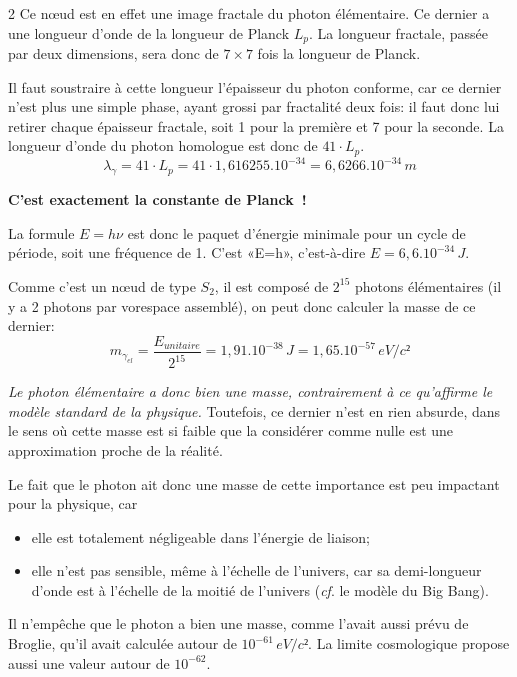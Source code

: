 \begin{multicols}{2}
Ce nœud est en effet une image fractale du photon élémentaire. Ce dernier a une
longueur d'onde de la longueur de Planck $L_p$. La longueur fractale,
passée par deux dimensions, sera donc de $7\times 7$ fois la longueur de
Planck.

Il faut soustraire à cette longueur l'épaisseur du photon conforme, car ce
dernier n'est plus une simple phase, ayant grossi par fractalité deux
fois: il faut donc lui retirer chaque épaisseur fractale, soit 1 pour
la première et 7 pour la seconde. La longueur d'onde du photon
homologue est donc de $41 \cdot L_p$.
\begin{equation*}
\lambda_{\gamma} = 41 \cdot L_p = 41 \cdot 1,616255.10^{-34} = 6,6266.10^{-34}\,m
\end{equation*}

\textbf{C'est exactement la constante de Planck !}
\medskip

La formule $E=h\nu$ est donc le paquet d'énergie minimale pour un cycle
de période, soit une fréquence de 1. C'est «E=h», c'est-à-dire
$E=6,6.10^{-34}\,J$.
\medskip

Comme c'est un nœud de type $S_2$, il est composé de $2^{15}$ photons
élémentaires (il y a 2 photons par vorespace assemblé), on peut donc
calculer la masse de ce dernier:
\begin{equation*}
m_{\gamma_{el}} = \frac {E_{unitaire}} {2^{15}} = 1,91.10^{-38}\,J = 1,65.10^{-57}\,eV/c²
\end{equation*}

\textit{Le photon élémentaire a donc bien une masse, contrairement à ce
qu'affirme le modèle standard de la physique.} Toutefois, ce dernier
n'est en rien absurde, dans le sens où cette masse est si faible que la
considérer comme nulle est une approximation proche de la réalité.

Le fait que le photon ait donc une masse de cette importance est peu
impactant pour la physique, car

\begin{itemize}
	\item elle est totalement négligeable dans l'énergie de liaison;
	\item elle n'est pas sensible, même à l'échelle de l'univers, car sa
	demi-longueur d'onde est à l'échelle de la moitié de l'univers (\textit{cf}.
	le modèle du Big Bang).
\end{itemize}


Il n'empêche que le photon a bien une masse, comme l'avait aussi prévu
de Broglie, qu'il avait calculée autour de $10^{-61}\,eV/c²$\cite{debroglie1956tentative}. La limite
cosmologique propose aussi une valeur autour de $10^{-62}$.
\medskip


\end{multicols}
